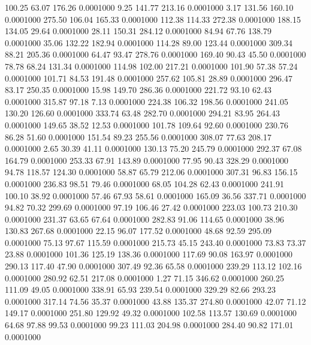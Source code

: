  100.25   63.07  176.26   0.0001000
   9.25  141.77  213.16   0.0001000
   3.17  131.56  160.10   0.0001000
 275.50  106.04  165.33   0.0001000
 112.38  114.33  272.38   0.0001000
 188.15  134.05   29.64   0.0001000
  28.11  150.31  284.12   0.0001000
  84.94   67.76  138.79   0.0001000
  35.06  132.22  182.94   0.0001000
 114.28   89.00  123.44   0.0001000
 309.34   88.21  205.36   0.0001000
  64.47   93.47  278.76   0.0001000
 169.40   90.43   45.50   0.0001000
  78.78   68.24  131.34   0.0001000
 114.98  102.00  217.21   0.0001000
 101.90   57.38   57.24   0.0001000
 101.71   84.53  191.48   0.0001000
 257.62  105.81   28.89   0.0001000
 296.47   83.17  250.35   0.0001000
  15.98  149.70  286.36   0.0001000
 221.72   93.10   62.43   0.0001000
 315.87   97.18    7.13   0.0001000
 224.38  106.32  198.56   0.0001000
 241.05  130.20  126.60   0.0001000
 333.74   63.48  282.70   0.0001000
 294.21   83.95  264.43   0.0001000
 149.65   38.52   12.53   0.0001000
 101.78  109.64   92.60   0.0001000
 230.76   86.28   51.60   0.0001000
 151.54   89.23  255.56   0.0001000
 308.07   77.63  208.17   0.0001000
   2.65   30.39   41.11   0.0001000
 130.13   75.20  245.79   0.0001000
 292.37   67.08  164.79   0.0001000
 253.33   67.91  143.89   0.0001000
  77.95   90.43  328.29   0.0001000
  94.78  118.57  124.30   0.0001000
  58.87   65.79  212.06   0.0001000
 307.31   96.83  156.15   0.0001000
 236.83   98.51   79.46   0.0001000
  68.05  104.28   62.43   0.0001000
 241.91  100.10   38.92   0.0001000
  57.46   67.93   58.61   0.0001000
 165.09   36.56  337.71   0.0001000
  94.82   70.32  299.69   0.0001000
  97.19  106.46   27.42   0.0001000
 223.03  100.73  210.30   0.0001000
 231.37   63.65   67.64   0.0001000
 282.83   91.06  114.65   0.0001000
  38.96  130.83  267.68   0.0001000
  22.15   96.07  177.52   0.0001000
  48.68   92.59  295.09   0.0001000
  75.13   97.67  115.59   0.0001000
 215.73   45.15  243.40   0.0001000
  73.83   73.37   23.88   0.0001000
 101.36  125.19  138.36   0.0001000
 117.69   90.08  163.97   0.0001000
 290.13  117.40   47.90   0.0001000
 307.49   92.36   65.58   0.0001000
 239.29  113.12  102.16   0.0001000
 280.92   62.51  217.08   0.0001000
   1.27   71.15  346.62   0.0001000
 260.25  111.09   49.05   0.0001000
 338.91   65.93  239.54   0.0001000
 329.29   82.66  293.23   0.0001000
 317.14   74.56   35.37   0.0001000
  43.88  135.37  274.80   0.0001000
  42.07   71.12  149.17   0.0001000
 251.80  129.92   49.32   0.0001000
 102.58  113.57  130.69   0.0001000
  64.68   97.88   99.53   0.0001000
  99.23  111.03  204.98   0.0001000
 284.40   90.82  171.01   0.0001000
